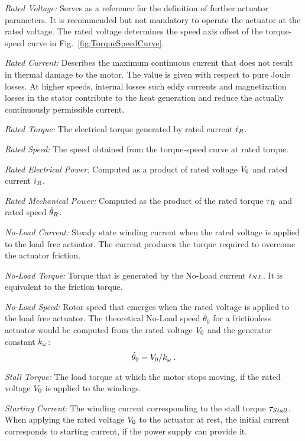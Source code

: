 \documentclass[a4paper,10pt]{cjtdsheet}      %
\begin{document}
\begin{multicols}{2}
\emph{Rated Voltage:} Serves as a reference for the definition of further actuator parameters. It is recommended but not mandatory to operate the actuator at the rated voltage. The rated voltage determines the speed axis offset of the torque-speed curve in Fig.~\ref{fig:TorqueSpeedCurve}. 

\emph{Rated Current:} Describes the maximum continuous current that does not result in thermal damage to the motor. The value is given with respect to pure Joule losses. At higher speeds, internal losses such eddy currents and magnetization losses in the stator contribute to the heat generation and reduce the actually continuously permissible current.

\emph{Rated Torque:} The electrical torque generated by rated current $i_R$.

\emph{Rated Speed:} The speed obtained from the torque-speed curve at rated torque. 

\emph{Rated Electrical Power:} Computed as a product of rated voltage $V_0$ and rated current $i_R$.

\emph{Rated Mechanical Power:} Computed as the product of the rated torque $\tau_R$ and rated speed $\dot{\theta}_R$.

\emph{No-Load Current:} Steady state winding current when the rated voltage is applied to the load free actuator. The current produces the torque required to overcome the actuator friction.

\emph{No-Load Torque:} Torque that is generated by the No-Load current $i_{NL}$. It is equivalent to the friction torque.

\emph{No-Load Speed:} Rotor speed that emerges when the rated voltage is applied to the load free actuator. The theoretical No-Load speed $\dot{\theta}_0$ for a frictionless actuator would be computed from the rated voltage $V_0$ and the generator constant $k_\omega$:
\begin{equation}
	\dot{\theta}_0 = V_0 / k_\omega\:.
\end{equation}

\emph{Stall Torque:} The load torque at which the motor stops moving, if the rated voltage $V_0$ is applied to the windings.

\emph{Starting Current:} The winding current corresponding to the stall torque $\tau_{Stall}$. When applying the rated voltage $V_0$ to the actuator at rest, the initial current corresponds to starting current, if the power supply can provide it.


\end{multicols}
\end{document}
